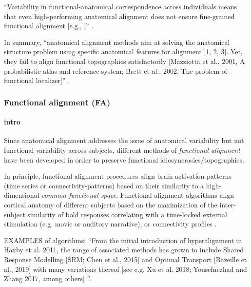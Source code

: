 %
``Variability in functional-anatomical correspondence across individuals means
that even high-performing anatomical alignment does not ensure fine-grained
functional alignment [e.g., \citet{frost2012measuring}]''
\citep{kumar2020brainiak}.

In summary, ``anatomical alignment methods aim at solving the anatomical
structure problem using specific anatomical features for alignment [1, 2, 3].
Yet, they fail to align functional topographies satisfactorily [Mazziotta et
al., 2001, A probabilistic atlas and reference system; Brett et al., 2002, The
problem of functional localizer]'' \citep{turek2017semi}.


\subsubsection{Functional alignment (FA)}



\paragraph{intro}


Since anatomical alignment addresses the issue of anatomical variability but not
functional variability across subjects, different methods of \textit{functional
alignment} have been developed in order to preserve functional
idiosyncrasies/topographies.

In principle, functional alignment procedures align brain activation patterns
(time series or connectivity-patterns) based on their similarity to a
high-dimensional \textit{common functional space}.
%
Functional alignment algorithms align cortical anatomy of different subjects
based on the maximization of the inter-subject similarity of \ac{bold} responses
\citep{haxby2011common, chen2015reduced, sabuncu2010function} correlating with a
time-locked external stimulation (e.g. movie or auditory narrative), or
connectivity profiles \citep{feilong2018reliable, guntupalli2018computational}.

EXAMPLES of algorithms: ``From the initial introduction of hyperalignment in
Haxby et al.  2011, the range of associated methods has grown to include Shared
Response Modelling [SRM; Chen et al., 2015] and Optimal Transport [Bazeille et
al., 2019] with many variations thereof [see e.g. Xu et al. 2018; Yousefnezhad
and Zhang 2017, among others] \citep{bazeille2021empirical}''.

